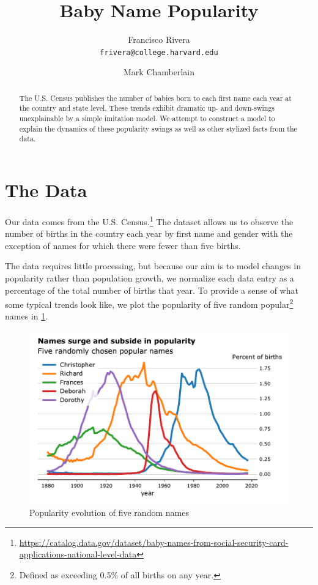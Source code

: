 \documentclass[a4paper]{article}
\begin{document}
\title{Baby Name Popularity}
\author{
Francisco Rivera \\ \texttt{frivera@college.harvard.edu}
\and
Mark Chamberlain}

\maketitle

\begin{abstract}
The U.S. Census publishes the number of babies born to each first name each year
at the country and state level. These trends exhibit dramatic up- and
down-swings unexplainable by a simple imitation model. We attempt to construct a
model to explain the dynamics of these popularity swings as well as other
stylized facts from the data.
\end{abstract}

\section{The Data}

Our data comes from the U.S.
Census.\footnote{\url{https://catalog.data.gov/dataset/baby-names-from-social-security-card-applications-national-level-data}}
The dataset allows us to observe the number of births in the country each year
by first name and gender with the exception of names for which there were fewer
than five births.

The data requires little processing, but because our aim is to model changes in
popularity rather than population growth, we normalize each data entry as a
percentage of the total number of births that year. To provide a sense of what
some typical trends look like, we plot the popularity of five random
popular\footnote{Defined as exceeding 0.5\% of all births on any year.} names in
\cref{fig:fivenames}.

\begin{figure}[h]
\centering
\includegraphics[width=.9\textwidth]{figs/five-rand-names}
\caption{Popularity evolution of five random names}
\label{fig:fivenames}
\end{figure}
\end{document}
